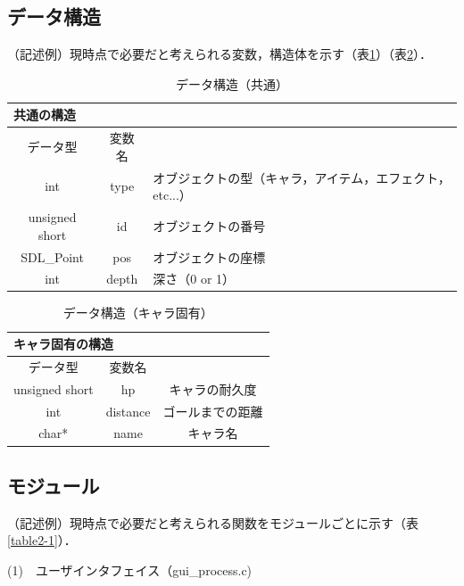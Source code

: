\documentclass{jsarticle}
\begin{document}
\subsection{データ構造}
（記述例）現時点で必要だと考えられる変数，構造体を示す（表\ref{table1-1}）（表\ref{table1-2}）．

\begin{table}[tb]
\begin{center}
\caption{データ構造（共通）}
\label{table1-1}
\begin{tabular}{|c||c|l|}\hline
\multicolumn{3}{|l|}{共通の構造}\\ \hline
データ型 & 変数名 &  \\ \hline \hline
int & type & オブジェクトの型（キャラ，アイテム，エフェクト，etc...） \\ \hline
unsigned short & id & オブジェクトの番号 \\ \hline
SDL\_Point & pos & オブジェクトの座標 \\ \hline
int & depth & 深さ（0 or 1） \\ \hline
\end{tabular}
\end{center}
\end{table}

\begin{table}[tb]
\begin{center}
\caption{データ構造（キャラ固有）}
\label{table1-2}
\begin{tabular}{|c||c|c|}\hline
\multicolumn{3}{|l|}{キャラ固有の構造}\\ \hline
データ型 & 変数名 &  \\ \hline \hline
unsigned short & hp & キャラの耐久度 \\ \hline
int & distance & ゴールまでの距離 \\ \hline
char* & name & キャラ名 \\ \hline
\end{tabular}
\end{center}
\end{table}


\subsection{モジュール}
（記述例）現時点で必要だと考えられる関数をモジュールごとに示す（表\ref{table2-1}）．

\noindent
(1)　ユーザインタフェイス（gui\_process.c)
\par
\end{document}
